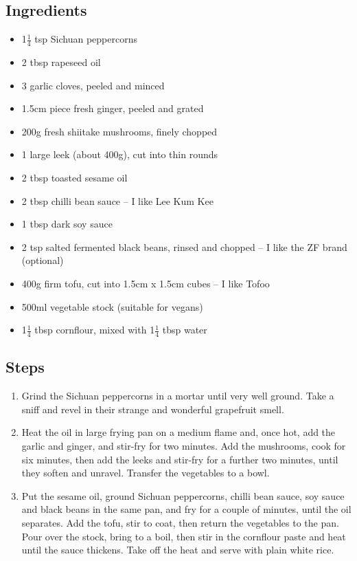 \documentclass{book}
\begin{document}
\subsection*{Ingredients}
\begin{itemize}
\item 1$\frac{1}{4}$ tsp Sichuan peppercorns 
\item 2 tbsp rapeseed oil 
\item 3 garlic cloves, peeled and minced
\item 1.5cm piece fresh ginger, peeled and grated
\item 200g fresh shiitake mushrooms, finely chopped 
\item 1 large leek (about 400g), cut into thin rounds
\item 2 tbsp toasted sesame oil 
\item 2 tbsp chilli bean sauce – I like Lee Kum Kee 
\item 1 tbsp dark soy sauce 
\item 2 tsp salted fermented black beans, rinsed and chopped – I like the ZF brand (optional)
\item 400g firm tofu, cut into 1.5cm x 1.5cm cubes – I like Tofoo
\item 500ml vegetable stock (suitable for vegans) 
\item 1$\frac{1}{4}$ tbsp cornflour, mixed with 1$\frac{1}{4}$ tbsp water
\end{itemize}

\subsection*{Steps}
\begin{enumerate}
\item Grind the Sichuan peppercorns in a mortar until very well ground. Take a sniff and revel in their strange and wonderful grapefruit smell.
\item Heat the oil in large frying pan on a medium flame and, once hot, add the garlic and ginger, and stir-fry for two minutes. Add the mushrooms, cook for six minutes, then add the leeks and stir-fry for a further two minutes, until they soften and unravel. Transfer the vegetables to a bowl.
\item Put the sesame oil, ground Sichuan peppercorns, chilli bean sauce, soy sauce and black beans in the same pan, and fry for a couple of minutes, until the oil separates. Add the tofu, stir to coat, then return the vegetables to the pan. Pour over the stock, bring to a boil, then stir in the cornflour paste and heat until the sauce thickens. Take off the heat and serve with plain white rice.
\end{enumerate}
\newpage
\end{document}
